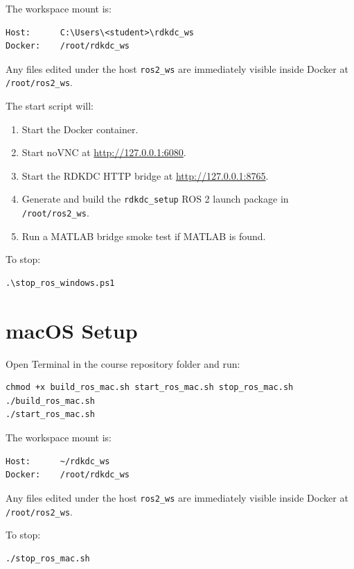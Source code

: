 \documentclass[11pt]{article}
\begin{document}
The workspace mount is:

\begin{Verbatim}
Host:      C:\Users\<student>\rdkdc_ws
Docker:    /root/rdkdc_ws
\end{Verbatim}

Any files edited under the host \texttt{ros2\_ws} are immediately visible inside Docker at \texttt{/root/ros2\_ws}.

The start script will:

\begin{enumerate}
    \item Start the Docker container.
    \item Start noVNC at \url{http://127.0.0.1:6080}.
    \item Start the RDKDC HTTP bridge at \url{http://127.0.0.1:8765}.
    \item Generate and build the \texttt{rdkdc\_setup} ROS 2 launch package in \texttt{/root/ros2\_ws}.
    \item Run a MATLAB bridge smoke test if MATLAB is found.
\end{enumerate}

To stop:

\begin{Verbatim}
.\stop_ros_windows.ps1
\end{Verbatim}

\section*{macOS Setup}

Open Terminal in the course repository folder and run:

\begin{Verbatim}
chmod +x build_ros_mac.sh start_ros_mac.sh stop_ros_mac.sh
./build_ros_mac.sh
./start_ros_mac.sh
\end{Verbatim}

The workspace mount is:

\begin{Verbatim}
Host:      ~/rdkdc_ws
Docker:    /root/rdkdc_ws
\end{Verbatim}

Any files edited under the host \texttt{ros2\_ws} are immediately visible inside Docker at \texttt{/root/ros2\_ws}.

To stop:

\begin{Verbatim}
./stop_ros_mac.sh
\end{Verbatim}
\end{document}
